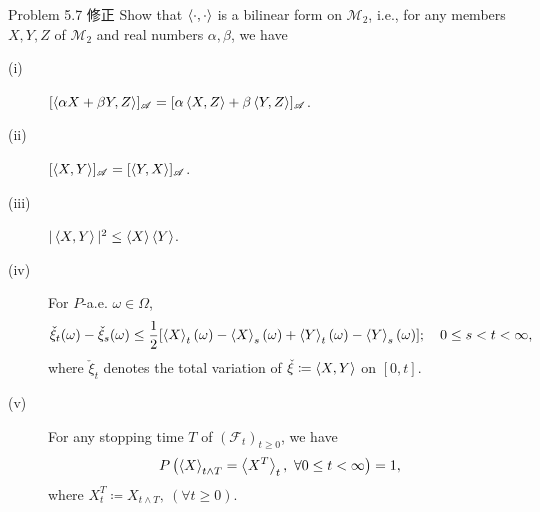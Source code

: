 	\begin{itembox}[l]{Problem 5.7 修正}
		Show that $\inprod<\cdot,\cdot>$ is a bilinear form on $\mathscr{M}_2$, i.e.,
		for any members $X,Y,Z$ of $\mathscr{M}_2$ and real numbers $\alpha,\beta$, we have
		\begin{description}
			\item[(i)] $[\inprod<\alpha X + \beta Y,Z>]_{\mathscr{A}} 
				= [\alpha \inprod<X,Z> + \beta \inprod<Y,Z>]_{\mathscr{A}}$.
			\item[(ii)] $[\inprod<X,Y>]_{\mathscr{A}} = [\inprod<Y,X>]_{\mathscr{A}}$.
			\item[(iii)] $|\inprod<X,Y>|^2 \leq \inprod<X> \inprod<Y>$.
			\item[(iv)] For $P$-a.e. $\omega \in \Omega$,
				\begin{align}
					\check{\xi}_t(\omega) - \check{\xi}_s(\omega)
					\leq \frac{1}{2}[\inprod<X>_t(\omega) - \inprod<X>_s(\omega)
						+ \inprod<Y>_t(\omega) - \inprod<Y>_s(\omega)];
						\quad 0 \leq s < t < \infty,
				\end{align}
				where $\check{\xi}_t$ denotes the total variation of 
				$\check{\xi} \coloneqq \inprod<X,Y>$ on $[0,t]$.
				
			\item[(v)] For any stopping time $T$ of $(\mathscr{F}_t)_{t \geq 0}$, we have 
				\begin{align}
					P \left( \inprod<X>_{t \wedge T} = \inprod<X^T>_t,\ \forall 0 \leq t < \infty \right) = 1,
				\end{align}
				where $X^T_t \coloneqq X_{t \wedge T},\ (\forall t \geq 0)$.
		\end{description}
	\end{itembox}
	
